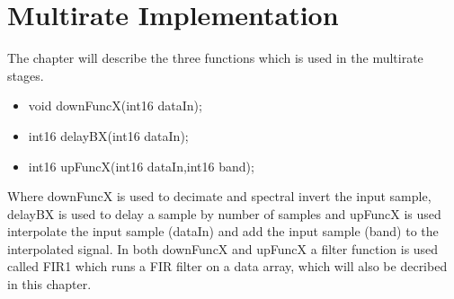 \chapter{Multirate Implementation}
The chapter will describe the three functions which is used in the multirate stages.
\begin{itemize}
\item void downFuncX(int16 dataIn);
\item int16 delayBX(int16 dataIn);
\item int16 upFuncX(int16 dataIn,int16 band);
\end{itemize}
Where downFuncX is used to decimate and spectral invert the input sample, delayBX is used to delay a sample by number of samples and upFuncX is used interpolate the input sample (dataIn) and add the input sample (band) to the interpolated signal. In both downFuncX and upFuncX a filter function is used called FIR1 which runs a FIR filter on a data array, which will also be decribed in this chapter. 


